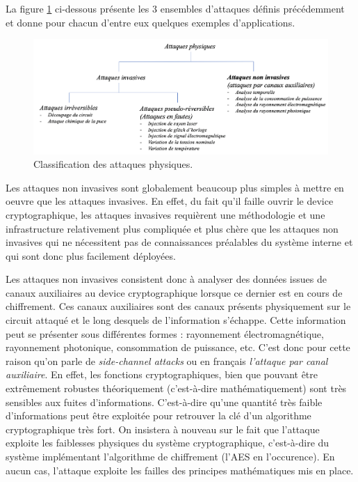 \documentclass[oneside]{book}
\begin{document}
\hspace{-0.5 cm}La figure \ref{fig:attaques} ci-dessous présente les 3 ensembles d'attaques définis précédemment et donne pour chacun d'entre eux quelques exemples d'applications.
\begin{figure}[htbp]
    \hspace{-1.82 cm}
    \includegraphics[width=1.19\textwidth]{image/attaques}
    \caption{Classification des attaques physiques.}
    \label{fig:attaques}
\end{figure}

\vspace{0.25 cm}Les attaques non invasives sont globalement beaucoup plus simples à mettre en oeuvre que les attaques invasives. En effet, du fait qu'il faille ouvrir le device cryptographique, les attaques invasives requièrent une méthodologie et une infrastructure relativement plus compliquée et plus chère que les attaques non invasives qui ne nécessitent pas de connaissances préalables du système interne et qui sont donc plus facilement déployées. 

\hspace{-0.5 cm}Les attaques non invasives consistent donc à analyser des données issues de canaux auxiliaires au device cryptographique lorsque ce dernier est en cours de chiffrement. Ces canaux auxiliaires sont des canaux présents physiquement sur le circuit attaqué et le long desquels de l’information s’échappe. Cette information peut se présenter sous différentes formes : rayonnement électromagnétique, rayonnement photonique, consommation de puissance, etc. C'est donc pour cette raison qu'on parle de \textit{side-channel attacks} ou en français \textit{l'attaque par canal auxiliaire}. 
En effet, les fonctions cryptographiques, bien que pouvant être extrêmement robustes théoriquement (c'est-à-dire mathématiquement) sont très sensibles aux fuites d’informations. C'est-à-dire qu'une quantité très faible d’informations peut être exploitée pour retrouver la clé d'un algorithme cryptographique très fort. On insistera à nouveau sur le fait que l'attaque exploite les faiblesses physiques du système cryptographique, c'est-à-dire du système implémentant l'algorithme de chiffrement (l'AES en l'occurence). En aucun cas, l'attaque exploite les failles des principes mathématiques mis en place.
\end{document}
